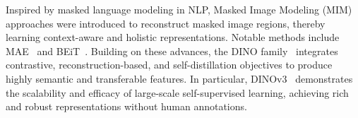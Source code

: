 Inspired by masked language modeling in NLP, Masked Image Modeling (MIM) approaches were introduced to reconstruct masked image regions, thereby learning context-aware and holistic representations. Notable methods include MAE~\cite{he2022masked} and BEiT~\cite{baobeit}. Building on these advances, the DINO family~\cite{caron2021emerging, oquab2023dinov2, simeoni2025dinov3} integrates contrastive, reconstruction-based, and self-distillation objectives to produce highly semantic and transferable features. In particular, DINOv3~\cite{simeoni2025dinov3} demonstrates the scalability and efficacy of large-scale self-supervised learning, achieving rich and robust representations without human annotations.